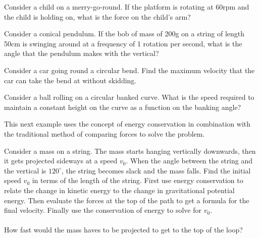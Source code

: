 \documentclass[../classical_mechanics.tex]{subfiles}
\begin{document}
        \begin{example}
            Consider a child on a merry-go-round.
            If the platform is rotating at 60rpm and the child is holding on, what is the force on the child's arm?
        \end{example}
        \begin{example}
            Consider a conical pendulum. 
            If the bob of mass of 200g on a string of length 50cm is swinging around at a frequency of 1 rotation per second, what is the angle that the pendulum makes with the vertical?
        \end{example}
        \begin{example}
            Consider a car going round a circular bend.
            Find the maximum velocity that the car can take the bend at without skidding.
        \end{example}
        \begin{example}
            Consider a ball rolling on a circular banked curve.
            What is the speed required to maintain a constant height on the curve as a function on the banking angle?
        \end{example}
        This next example uses the concept of energy conservation in combination with the traditional method of comparing forces to solve the problem.
        \begin{example}
            Consider a mass on a string.
            The mass starts hanging vertically downwards, then it gets projected sideways at a speed $v_0$.
            When the angle between the string and the vertical is $120^\circ$, the string becomes slack and the mass falls.
            Find the initial speed $v_0$ in terms of the length of the string.
            First use energy conservation to relate the change in kinetic energy to the change in gravitational potential energy.
            Then evaluate the forces at the top of the path to get a formula for the final velocity.
            Finally use the conservation of energy to solve for $v_0$.

            \paragraph{}
            How fast would the mass haves to be projected to get to the top of the loop?
        \end{example}
\end{document}
